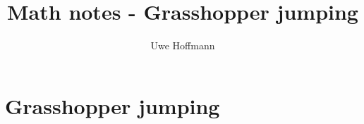 

\title{Math notes - Grasshopper jumping}
\author{Uwe Hoffmann}



\setcounter{chapter}{0}
\chapter{Grasshopper jumping}
